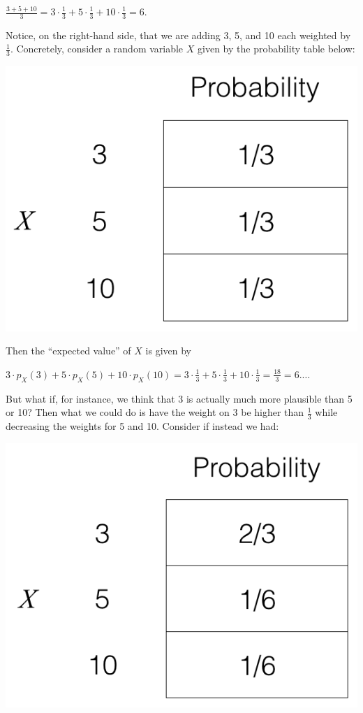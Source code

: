 \documentclass[6008notes.tex]{subfiles}
\begin{document}
{\centering$\frac{3+5+10}{3}=3\cdot \frac{1}{3}+5\cdot \frac{1}{3}+10\cdot \frac{1}{3}=6.$ \par}
 
Notice, on the right-hand side, that we are adding 3, 5, and 10 each weighted by $\frac{1}{3}$. Concretely, consider a random variable $X$ given by the probability table below:

{\centering\includegraphics[scale=0.3]{images_sec-expectation-example1} \par}

Then the ``expected value'' of $X$ is given by

{\centering$3\cdot p_{X}(3)+5\cdot p_{X}(5)+10\cdot p_{X}(10)=3\cdot \frac{1}{3}+5\cdot \frac{1}{3}+10\cdot \frac{1}{3}=\frac{18}{3}=6.\dots$ \par}
 
But what if, for instance, we think that 3 is actually much more plausible than 5 or 10? Then what we could do is have the weight on 3 be higher than $\frac{1}{3}$ while decreasing the weights for 5 and 10. Consider if instead we had:

{\centering\includegraphics[scale=0.3]{images_sec-expectation-example2} \par}
\end{document}
